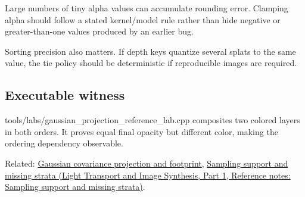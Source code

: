 Large numbers of tiny alpha values can accumulate rounding error. Clamping alpha should follow a stated kernel/model rule rather than hide negative or greater-than-one values produced by an earlier bug.

Sorting precision also matters. If depth keys quantize several splats to the same value, the tie policy should be deterministic if reproducible images are required.

\subsection{Executable witness}\label{appendix-5f4b2e24c3f6-executable-witness}

\hypertarget{appendix-5f4b2e24c3f6-executable-witness}{}

tools/labs/gaussian\_projection\_reference\_lab.cpp composites two colored layers in both orders. It proves equal final opacity but different color, making the ordering dependency observable.

Related: \hyperref[appendix-24269cb6977c]{Gaussian covariance projection and footprint}, \href{../04-Light-Transport-and-Image-Synthesis-P01/main.pdf\#nameddest=appendix-10308c3d753e}{Sampling support and missing strata (Light Transport and Image Synthesis, Part 1, Reference notes: Sampling support and missing strata)}.
